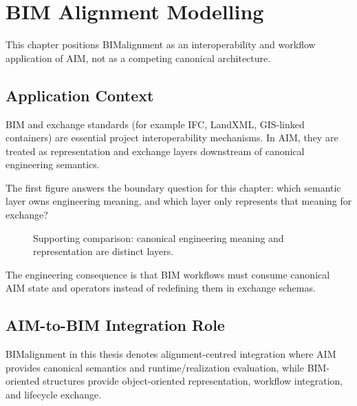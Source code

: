 
\chapter{BIM Alignment Modelling}

\label{chap:applications-bimalignment}

This chapter positions BIMalignment as an interoperability and workflow
application of AIM, not as a competing canonical architecture.

\section{Application Context}

BIM and exchange standards (for example IFC, LandXML, GIS-linked
containers) are essential project interoperability mechanisms. In AIM,
they are treated as representation and exchange layers downstream of
canonical engineering semantics.

The first figure answers the boundary question for this chapter: which
semantic layer owns engineering meaning, and which layer only represents
that meaning for exchange?

\begin{figure}[ht]
\centering

\caption{Supporting comparison: canonical engineering meaning and representation are distinct layers.}
\label{fig:support-canonical-vs-representation}
\end{figure}

The engineering consequence is that BIM workflows must consume canonical
AIM state and operators instead of redefining them in exchange schemas.

\section{AIM-to-BIM Integration Role}

BIMalignment in this thesis denotes alignment-centred integration where
AIM provides canonical semantics and runtime/realization evaluation,
while BIM-oriented structures provide object-oriented representation,
workflow integration, and lifecycle exchange.


